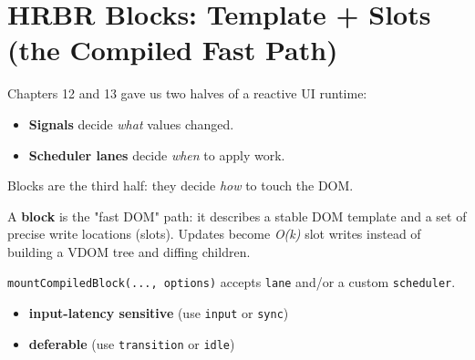 \chapter{HRBR Blocks: Template + Slots (the Compiled Fast Path)}
\label{ch:hrbr-blocks-template-slots}

Chapters 12 and 13 gave us two halves of a reactive UI runtime:

\begin{itemize}
  \item \textbf{Signals} decide \emph{what} values changed.
  \item \textbf{Scheduler lanes} decide \emph{when} to apply work.
\end{itemize}

Blocks are the third half: they decide \emph{how} to touch the DOM.

A \textbf{block} is the "fast DOM" path: it describes a stable DOM template and a set of precise write locations (slots). Updates become \emph{O(k)} slot writes instead of building a VDOM tree and diffing children.

\begin{center}

\vspace{1em}
\texttt{mountCompiledBlock(..., options)} accepts \texttt{lane} and/or a custom \texttt{scheduler}.
\begin{itemize}
  \item \textbf{input-latency sensitive} (use \texttt{input} or \texttt{sync})
  \item \textbf{deferable} (use \texttt{transition} or \texttt{idle})
\end{itemize}
\end{center}

